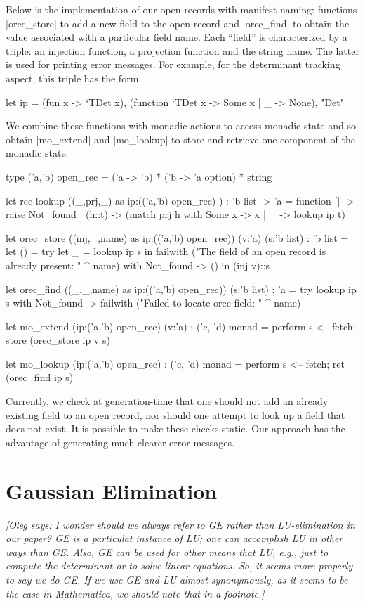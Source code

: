 \documentclass{elsart}
\newcommand{\oleg}[1]{{\it [Oleg says: #1]}}
\begin{document}
Below is the implementation of our open records with manifest
naming: functions |orec_store| to add a new field to the open record
and |orec_find| to obtain the value associated with a particular field
name. Each ``field'' is characterized by a triple: an injection function, 
a projection function and the string name. The latter is used for 
printing error messages. For example, for the
determinant tracking aspect, this triple has the form
\begin{code}
let ip = 
  (fun x -> `TDet x), (function `TDet x -> Some x | _ -> None), "Det"
\end{code}
We combine these functions with monadic
actions to access monadic state and so obtain 
|mo_extend| and |mo_lookup| to store and retrieve one component 
of the monadic state.
\begin{code}
type ('a,'b) open_rec = ('a -> 'b) * ('b -> 'a option)  * string

let rec lookup ((_,prj,_) as ip:(('a,'b) open_rec) )
   : 'b list -> 'a = 
   function [] -> raise Not_found
   | (h::t) -> (match prj h with Some x -> x | _ -> lookup ip t)

let orec_store ((inj,_,name) as ip:(('a,'b) open_rec)) (v:'a) (s:'b list) 
   : 'b list =
  let () = 
    try let _ = lookup ip s in 
        failwith ("The field of an open record is already present: " ^ name)
    with Not_found -> () in
  (inj v)::s

let orec_find ((_,_,name) as ip:(('a,'b) open_rec)) (s:'b list) : 'a =
  try lookup ip s 
  with Not_found -> failwith ("Failed to locate orec field: " ^ name)

let mo_extend (ip:('a,'b) open_rec) (v:'a) : ('c, 'd) monad = 
  perform s <-- fetch; store (orec_store ip v s)

let mo_lookup (ip:('a,'b) open_rec) : ('c, 'd) monad =
  perform s <-- fetch; ret (orec_find ip s)
\end{code}
%
Currently, we check at generation-time that one should not add an
already existing field to an open record, nor should one attempt to
look up a field that does not exist. It is possible to make these
checks static.  Our approach has the advantage of generating much
clearer error messages.

\section{Gaussian Elimination}\label{GE-algorithm}

\oleg{I wonder should we always refer to GE rather than LU-elimination
  in our paper? GE is a particulat instance of LU; one can accomplish
  LU in other ways than GE. Also, GE can be used for other means that
  LU, e.g., just to compute the determinant or to solve linear equations.
  So, it seems more properly to say we do GE. If we use GE and LU
  almost synonymously, as it seems to be the case in Mathematica, we
  should note that in a footnote.}
\end{document}
